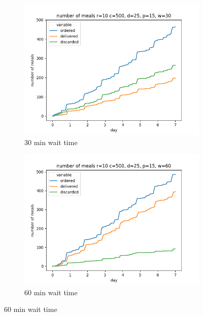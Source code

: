 \begin{center}
    \begin{figure}
        \centering
        \begin{subfigure}[m]{0.30\textwidth}
            \centering
            \includegraphics[width=\textwidth]{sections/run3/week_nd_1_food_ordering_distribution_500_10_25_30}
            \caption{30 min wait time}
        \end{subfigure}
        \hfill
        \begin{subfigure}[m]{0.30\textwidth}
            \centering
            \includegraphics[width=\textwidth]{sections/run3/week_nd_2_food_ordering_distribution_500_10_25_60}
            \caption{60 min wait time}
        \end{subfigure}

\end{figure}
\end{center}
